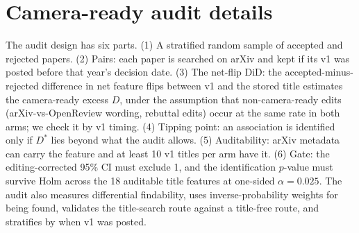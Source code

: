 \section{Camera-ready audit details}
\label{app:nt-audit}

The audit design has six parts. (1) A stratified random sample of accepted and rejected papers. (2) Pairs: each paper is searched on arXiv and kept if its v1 was posted before that year's decision date. (3) The net-flip DiD: the accepted-minus-rejected difference in net feature flips between v1 and the stored title estimates the camera-ready excess $D$, under the assumption that non-camera-ready edits (arXiv-vs-OpenReview wording, rebuttal edits) occur at the same rate in both arms; we check it by v1 timing. (4) Tipping point: an association is identified only if $D^*$ lies beyond what the audit allows. (5) Auditability: arXiv metadata can carry the feature and at least 10 v1 titles per arm have it. (6) Gate: the editing-corrected 95\% CI must exclude 1, and the identification $p$-value must survive Holm across the 18 auditable title features at one-sided $\alpha=0.025$. The audit also measures differential findability, uses inverse-probability weights for being found, validates the title-search route against a title-free route, and stratifies by when v1 was posted.

